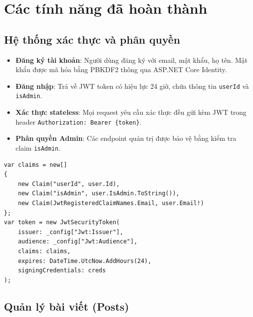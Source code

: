 \documentclass[a4paper]{article}
\begin{document}
\newpage

\section{Các tính năng đã hoàn thành}

\subsection{Hệ thống xác thực và phân quyền}

\begin{itemize}
    \item \textbf{Đăng ký tài khoản}: Người dùng đăng ký với email, mật khẩu, họ tên. Mật khẩu được mã hóa bằng PBKDF2 thông qua ASP.NET Core Identity.
    \item \textbf{Đăng nhập}: Trả về JWT token có hiệu lực 24 giờ, chứa thông tin \texttt{userId} và \texttt{isAdmin}.
    \item \textbf{Xác thực stateless}: Mọi request yêu cầu xác thực đều gửi kèm JWT trong header \texttt{Authorization: Bearer \{token\}}.
    \item \textbf{Phân quyền Admin}: Các endpoint quản trị được bảo vệ bằng kiểm tra claim \texttt{isAdmin}.
\end{itemize}

\begin{mdframed}[hidealllines=true,backgroundcolor=lightblue]
\begin{lstlisting}[language=CSharp, caption=Đoạn mã tạo JWT Token trong AuthService]
var claims = new[]
{
    new Claim("userId", user.Id),
    new Claim("isAdmin", user.IsAdmin.ToString()),
    new Claim(JwtRegisteredClaimNames.Email, user.Email!)
};
var token = new JwtSecurityToken(
    issuer: _config["Jwt:Issuer"],
    audience: _config["Jwt:Audience"],
    claims: claims,
    expires: DateTime.UtcNow.AddHours(24),
    signingCredentials: creds
);
\end{lstlisting}
\end{mdframed}

\subsection{Quản lý bài viết (Posts)}
\end{document}
